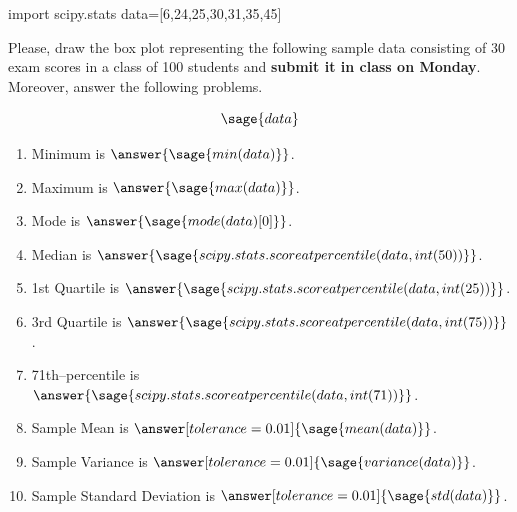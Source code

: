 \documentclass{ximera}
\begin{document}
\begin{problem}
\begin{sagesilent}
import scipy.stats
data=[6,24,25,30,31,35,45]
\end{sagesilent}
Please, draw the box plot representing the following sample data consisting of 30 exam scores in a class of 100 students and \textbf{submit it in class on Monday}. Moreover, answer the following problems.

$$\sage{data}$$

\begin{enumerate}
    \item Minimum is $\answer{\sage{min(data)}}$.
    \item Maximum is $\answer{\sage{max(data)}}$.
    \item Mode is $\answer{\sage{mode(data)[0]}}$.
    \item Median is $\answer{\sage{scipy.stats.scoreatpercentile(data,int(50))}}$.
    \item 1st Quartile is $\answer{\sage{scipy.stats.scoreatpercentile(data,int(25))}}$.
    \item 3rd Quartile is $\answer{\sage{scipy.stats.scoreatpercentile(data,int(75))}}$.
    \item 71th--percentile is $\answer{\sage{scipy.stats.scoreatpercentile(data,int(71))}}$.
    \item Sample Mean is $\answer[tolerance=0.01]{\sage{mean(data)}}$.
    \item Sample Variance is $\answer[tolerance=0.01]{\sage{variance(data)}}$.
    \item Sample Standard Deviation is $\answer[tolerance=0.01]{\sage{std(data)}}$.
\end{enumerate}
\end{problem}
\end{document}
